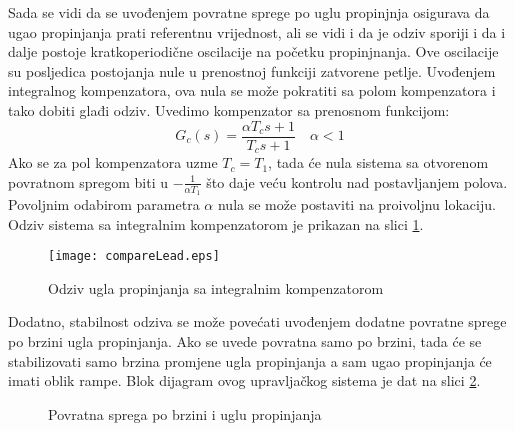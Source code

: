 Sada se vidi da se uvođenjem povratne sprege po uglu propinjnja osigurava da ugao propinjanja prati referentnu 
vrijednost, ali se vidi i da je odziv sporiji  i da i dalje postoje kratkoperiodične oscilacije na početku propinjnanja.
Ove oscilacije su posljedica postojanja nule u prenostnoj funkciji zatvorene petlje. 
Uvođenjem integralnog kompenzatora, ova nula se može pokratiti sa polom kompenzatora i tako dobiti glađi odziv.
Uvedimo kompenzator sa prenosnom funkcijom:
\begin{equation}
    G_c(s) = \frac{\alpha T_cs+1}{T_cs+1}  \quad \alpha<1
\end{equation}
Ako se za pol kompenzatora uzme $T_c = T_1$, tada će nula sistema sa otvorenom 
povratnom spregom biti u $-\frac{1}{\alpha T_1}$ što daje veću kontrolu nad postavljanjem 
polova. Povoljnim odabirom parametra $\alpha$ nula se može postaviti na proivoljnu lokaciju.
Odziv sistema sa integralnim kompenzatorom je prikazan na slici \ref{fig:komp}.
\begin{figure}[!ht]
    \centering
    \texttt{[image: compareLead.eps]}
    \caption{Odziv ugla propinjanja sa integralnim kompenzatorom}
    \label{fig:komp}
\end{figure}
Dodatno, stabilnost odziva se može povećati uvođenjem dodatne povratne sprege po brzini 
ugla propinjanja. Ako se uvede povratna samo po brzini, tada će se stabilizovati samo 
brzina promjene ugla propinjanja a sam ugao propinjanja će imati oblik rampe. 
Blok dijagram ovog upravljačkog sistema je dat na slici \ref{fig:kask}.
\begin{figure}[!ht]
    \centering
\caption{Povratna sprega po brzini i uglu propinjanja}
\label{fig:kask}
\end{figure}
